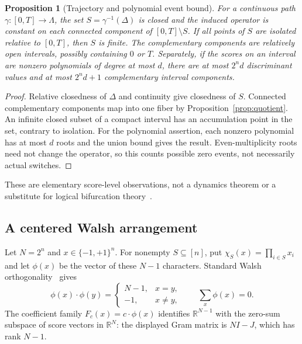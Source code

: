 \documentclass[11pt]{article}
\newtheorem{proposition}[theorem]{Proposition}
\theoremstyle{definition}
\theoremstyle{remark}
\newcommand{\R}{\mathbb R}
\begin{document}
\begin{proposition}[Trajectory and polynomial event bound]\label{prop:trajectory}
For a continuous path $\gamma:[0,T]\to\Lambda$, the set $S=\gamma^{-1}(\Delta)$ is closed and the induced operator is constant on each connected component of $[0,T]\setminus S$. If all points of $S$ are isolated relative to $[0,T]$, then $S$ is finite. The complementary components are \emph{relatively open} intervals, possibly containing $0$ or $T$. Separately, if the scores on an interval are nonzero polynomials of degree at most $d$, there are at most $2^n d$ discriminant values and at most $2^n d+1$ complementary interval components.
\end{proposition}
\begin{proof}
Relative closedness of $\Delta$ and continuity give closedness of $S$. Connected complementary components map into one fiber by Proposition~\ref{prop:quotient}. An infinite closed subset of a compact interval has an accumulation point in the set, contrary to isolation. For the polynomial assertion, each nonzero polynomial has at most $d$ roots and the union bound gives the result. Even-multiplicity roots need not change the operator, so this counts possible zero events, not necessarily actual switches.
\end{proof}
These are elementary score-level observations, not a dynamics theorem or a substitute for logical bifurcation theory~\cite{AbouJaoude2019}.

\subsection{A centered Walsh arrangement}
Let $N=2^n$ and $x\in\{-1,+1\}^n$. For nonempty $S\subseteq[n]$, put $\chi_S(x)=\prod_{i\in S}x_i$ and let $\phi(x)$ be the vector of these $N-1$ characters. Standard Walsh orthogonality~\cite{ODonnell2014} gives
\[
 \phi(x)\cdot\phi(y)=\begin{cases}N-1,&x=y,\\-1,&x\ne y,\end{cases}
 \qquad \sum_x\phi(x)=0.
\]
The coefficient family $F_c(x)=c\cdot\phi(x)$ identifies $\R^{N-1}$ with the zero-sum subspace of score vectors in $\R^N$: the displayed Gram matrix is $NI-J$, which has rank $N-1$.
\end{document}
